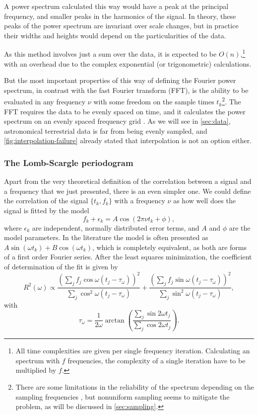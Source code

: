	A power spectrum calculated this way would have a peak at the principal frequency, and smaller peaks in the harmonics of the signal.
	In theory, these peaks of the power spectrum are invariant over scale changes, 
	but in practice their widths and heights would depend on the particularities of the data.
	
	As this method involves just a sum over the data, it is expected to be $O(n)$,\footnote{
		All time complexities are given per single frequency iteration. 
		Calculating an spectrum with $f$ frequencies, the complexity of a single iteration have to be multiplied by $f$.
	} 
	with an overhead due to the complex exponential (or trigonometric) calculations.
	
	But the most important properties of this way of defining the Fourier power spectrum, in contrast with the fast Fourier transform (FFT),
	is the ability to be evaluated in any frequency $\nu$ with some freedom on the sample times $t_k$\footnote{
		There are some limitations in the reliability of the spectrum depending on the sampling frequencies \citep{Marvasti2001},
		but nonuniform sampling seems to mitigate the problem, as will be discussed in \autoref{sec:sampling}.
	}. 
	The FFT requires the data to be evenly spaced on time, and it calculates the power spectrum on an evenly spaced frequency grid \citep{Brigham1974}.
	As we will see in \autoref{sec:data}, astronomical terrestrial data is far from being evenly sampled, 
	and \autoref{fig:interpolation-failure} already stated that interpolation is not an option either.
	
	
	\subsubsection{The Lomb-Scargle periodogram}
	
	Apart from the very theoretical definition of the correlation between a signal and a frequency that we just presented,
	there is an even simpler one. We could define the correlation of the signal $\{t_k,f_k\}$ with a frequency $\nu$ as 
	how well does the signal is fitted by the model
	$$
	f_k + \epsilon_k = A \cos(2\pi \nu t_k +\phi),
	$$
	where $\epsilon_k$ are independent, normally distributed error terms, and $A$ and $\phi$ are the model parameters.
	In the literature the model is often presented as $A\sin(\omega t_k)+B\cos(\omega t_k)$, 
	which is completely equivalent, as both are forms of a first order Fourier series.
	After the least squares minimization, the coefficient of determination of the fit is given by \citep{Lomb1976,Scargle1982}
	\begin{equation}
		R^2(\omega) \propto \frac{\left(\sum_j f_j \cos\omega (t_j-\tau_\omega)\right)^2}{\sum_j \cos^2\omega(t_j-\tau_\omega)}+
		\frac{\left(\sum_j f_j \sin\omega (t_j-\tau_\omega)\right)^2}{\sum_j \sin^2\omega(t_j-\tau_\omega)}, \label{eq:lomb-scargle}
	\end{equation}
	with
	\begin{equation}
		\tau_\omega = \frac{1}{2\omega}\arctan\left(\frac{\sum_j \sin 2 \omega t_j}{\sum_j \cos 2 \omega t_j}\right).  \label{eq:tau}
	\end{equation}
	
